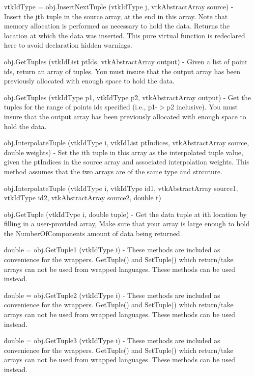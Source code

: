 \begin{DoxyItemize}
\item {\ttfamily vtk\-Id\-Type = obj.\-Insert\-Next\-Tuple (vtk\-Id\-Type j, vtk\-Abstract\-Array source)} -\/ Insert the jth tuple in the source array, at the end in this array. Note that memory allocation is performed as necessary to hold the data. Returns the location at which the data was inserted. This pure virtual function is redeclared here to avoid declaration hidden warnings.  
\item {\ttfamily obj.\-Get\-Tuples (vtk\-Id\-List pt\-Ids, vtk\-Abstract\-Array output)} -\/ Given a list of point ids, return an array of tuples. You must insure that the output array has been previously allocated with enough space to hold the data.  
\item {\ttfamily obj.\-Get\-Tuples (vtk\-Id\-Type p1, vtk\-Id\-Type p2, vtk\-Abstract\-Array output)} -\/ Get the tuples for the range of points ids specified (i.\-e., p1-\/$>$p2 inclusive). You must insure that the output array has been previously allocated with enough space to hold the data.  
\item {\ttfamily obj.\-Interpolate\-Tuple (vtk\-Id\-Type i, vtk\-Id\-List pt\-Indices, vtk\-Abstract\-Array source, double weights)} -\/ Set the ith tuple in this array as the interpolated tuple value, given the pt\-Indices in the source array and associated interpolation weights. This method assumes that the two arrays are of the same type and strcuture.  
\item {\ttfamily obj.\-Interpolate\-Tuple (vtk\-Id\-Type i, vtk\-Id\-Type id1, vtk\-Abstract\-Array source1, vtk\-Id\-Type id2, vtk\-Abstract\-Array source2, double t)}  
\item {\ttfamily obj.\-Get\-Tuple (vtk\-Id\-Type i, double tuple)} -\/ Get the data tuple at ith location by filling in a user-\/provided array, Make sure that your array is large enough to hold the Number\-Of\-Components amount of data being returned.  
\item {\ttfamily double = obj.\-Get\-Tuple1 (vtk\-Id\-Type i)} -\/ These methods are included as convenience for the wrappers. Get\-Tuple() and Set\-Tuple() which return/take arrays can not be used from wrapped languages. These methods can be used instead.  
\item {\ttfamily double = obj.\-Get\-Tuple2 (vtk\-Id\-Type i)} -\/ These methods are included as convenience for the wrappers. Get\-Tuple() and Set\-Tuple() which return/take arrays can not be used from wrapped languages. These methods can be used instead.  
\item {\ttfamily double = obj.\-Get\-Tuple3 (vtk\-Id\-Type i)} -\/ These methods are included as convenience for the wrappers. Get\-Tuple() and Set\-Tuple() which return/take arrays can not be used from wrapped languages. These methods can be used instead.  

\end{DoxyItemize}
